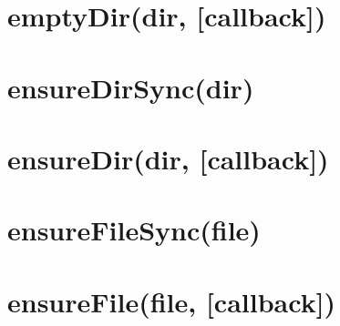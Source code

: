 \documentclass[twoside]{book}
\newcommand{\+}{\discretionary{\mbox{\scriptsize$\hookleftarrow$}}{}{}}
\begin{document}
\chapter{empty\+Dir(dir, \mbox{[}callback\mbox{]})}
\label{md_dsmacc_vis_degree_node_modules_electron-packager_node_modules_electron-download_node_modules_fs-extra_docs_emptyDir}

\chapter{ensure\+Dir\+Sync(dir)}
\label{md_dsmacc_vis_degree_node_modules_electron-packager_node_modules_electron-download_node_modules_fs-extra_docs_ensureDir-sync}

\chapter{ensure\+Dir(dir, \mbox{[}callback\mbox{]})}
\label{md_dsmacc_vis_degree_node_modules_electron-packager_node_modules_electron-download_node_modules_fs-extra_docs_ensureDir}

\chapter{ensure\+File\+Sync(file)}
\label{md_dsmacc_vis_degree_node_modules_electron-packager_node_modules_electron-download_node_modules_fs-extra_docs_ensureFile-sync}

\chapter{ensure\+File(file, \mbox{[}callback\mbox{]})}
\label{md_dsmacc_vis_degree_node_modules_electron-packager_node_modules_electron-download_node_modules_fs-extra_docs_ensureFile}

\end{document}
